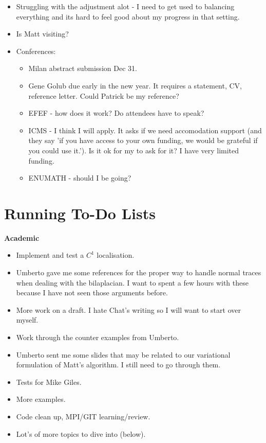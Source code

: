 \documentclass[12pt,a4paper]{article}
\begin{document}
\begin{itemize}
    \item Struggling with the adjustment alot - I need to get used to balancing everything and its hard to feel good about my progress in that setting. 
    \item Is Matt visiting? 
    \item Conferences:
    \begin{itemize}
    \setlength{\itemsep}{0.5em}
        \item Milan abstract submission Dec 31.
        \item Gene Golub due early in the new year. It requires a statement, CV, reference letter. Could Patrick be my reference?
        \item EFEF - how does it work? Do attendees have to speak? 
        \item ICMS - I think I will apply. It asks if we need accomodation support (and they say 'if you have access to your own funding, we would be grateful if you could use it.').  Is it ok for my to ask for it? I have very limited funding. 
        \item ENUMATH - should I be going? 
    \end{itemize}
\end{itemize}




\newpage


\section{Running To-Do Lists}

\textbf{Academic}

\begin{itemize}
    \item Implement and test a $C^1$ localisation.
    \item Umberto gave me some references for the proper way to handle normal traces when dealing with the bilaplacian. I want to spent a few hours with these because I have not seen those arguments before. 
    \item More work on a draft. I hate Chat's writing so I will want to start over myself. 
    \item Work through the counter examples from Umberto. 
    \item Umberto sent me some slides that may be related to our variational formulation of Matt's algorithm. I still need to go through them. 
    \item Tests for Mike Giles.
    \item More examples. 
    \item Code clean up, MPI/GIT learning/review. 
    \item Lot's of more topics to dive into (below). 
\end{itemize}
\end{document}
